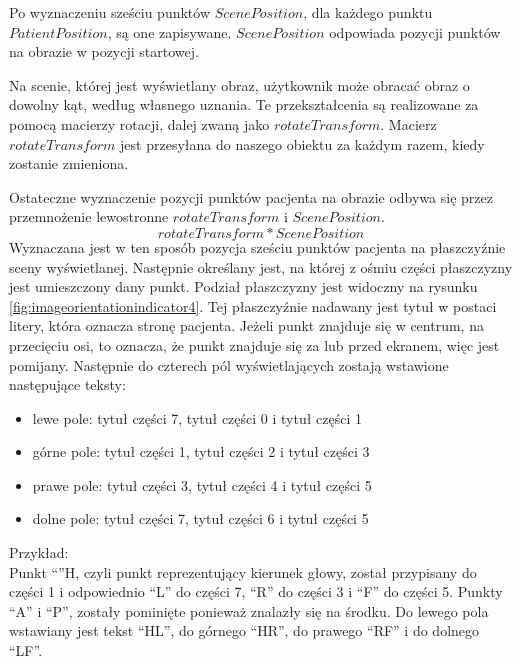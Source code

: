 \par
Po wyznaczeniu sześciu punktów $ScenePosition$, dla każdego punktu $PatientPosition$, są one zapisywane.
$ScenePosition$ odpowiada pozycji punktów na obrazie w pozycji startowej.

\par
Na scenie, której jest wyświetlany obraz, użytkownik może obracać obraz o dowolny kąt, według własnego uznania.
Te przekształcenia są realizowane za pomocą macierzy rotacji, dalej zwaną jako $rotateTransform$.
Macierz $rotateTransform$ jest przesyłana do naszego obiektu  za każdym razem, kiedy zostanie zmieniona.

\par
Ostateczne wyznaczenie pozycji punktów pacjenta na obrazie odbywa się przez przemnożenie lewostronne $rotateTransform$ i $ScenePosition$.
\[rotateTransform * ScenePosition\]
Wyznaczana jest w ten sposób pozycja sześciu punktów pacjenta na płaszczyźnie sceny wyświetlanej.
Następnie określany jest, na której z ośmiu części płaszczyzny jest umieszczony dany punkt.
Podział płaszczyzny jest widoczny na rysunku \ref{fig:imageorientationindicator4}.
Tej płaszczyźnie nadawany jest tytuł w postaci litery, która oznacza stronę pacjenta.
Jeżeli punkt znajduje się w centrum, na przecięciu osi, to oznacza, że punkt znajduje się za lub przed ekranem, więc jest pomijany.
Następnie do czterech pól wyświetlających zostają wstawione następujące teksty:
\begin{itemize}
    \item lewe pole: tytuł części 7, tytuł części 0 i tytuł części 1
    \item górne pole: tytuł części 1, tytuł części 2 i tytuł części 3
    \item prawe pole: tytuł części 3, tytuł części 4 i tytuł części 5
    \item dolne pole: tytuł części 7, tytuł części 6 i tytuł części 5
\end{itemize}

\par
Przykład:\\
Punkt \enquote{}{H}, czyli punkt reprezentujący kierunek głowy, został przypisany do części 1 i odpowiednio \enquote{L} do części 7, \enquote{R} do części 3 i \enquote{F} do części 5.
Punkty \enquote{A} i \enquote{P}, zostały pominięte ponieważ znalazły się na środku.
Do lewego pola wstawiany jest tekst \enquote{HL}, do górnego \enquote{HR}, do prawego \enquote{RF} i do dolnego \enquote{LF}.

